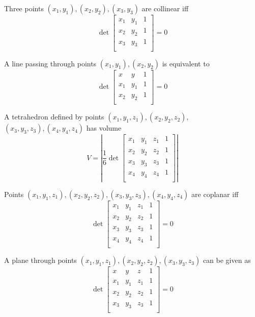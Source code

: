 \begin{theorem}
    Three points \((x_1,y_1),(x_2,y_2),(x_3,y_3)\) are collinear iff 
    \[
        \det \begin{bmatrix}
            x_1 &y_1  &1   \\
             x_2&y_2  &1   \\
             x_3&y_3  &1   \\
        \end{bmatrix}=0
    \]
\end{theorem}
\begin{theorem}
    A line passing through points \((x_1,y_1),(x_2,y_2)\) is equivalent to
    \[
        \det \begin{bmatrix}
            x&y  &1   \\
            x_1 &y_1  &1   \\
             x_2&y_2  &1   \\
        \end{bmatrix}=0
    \]
\end{theorem}
\begin{theorem}
    A tetrahedron defined by points \((x_1,y_1,z_1),(x_2,y_2,z_2),\) \((x_3,y_3,z_3),(x_4,y_4,z_4)\) has volume 
    \[
        V=\left\vert \frac{1}{6}\det \begin{bmatrix}
            x_1 &y_1  &z_1  &   1\\
             x_2&y_2  &z_2  &1   \\
             x_3&y_3  &z_3  &1   \\
             x_4&y_4  &z_4  &1   \\
        \end{bmatrix} \right\vert 
    \]
\end{theorem}
\begin{theorem}
    Points \((x_1,y_1,z_1),(x_2,y_2,z_2),\)\((x_3,y_3,z_3),(x_4,y_4,z_4)\) are coplanar iff 
    \[
        \det \begin{bmatrix}
            x_1 &y_1  &z_1  &   1\\
             x_2&y_2  &z_2  &1   \\
             x_3&y_3  &z_3  &1   \\
             x_4&y_4  &z_4  &1   \\
        \end{bmatrix}=0
    \]
\end{theorem}
\begin{theorem}
    A plane through points \((x_1,y_1,z_1),(x_2,y_2,z_2),(x_3,y_3,z_3)\) can be given as
    \[
        \det \begin{bmatrix}
            x&y  &z  &1   \\
            x_1 &y_1  &z_1  &   1\\
             x_2&y_2  &z_2  &1   \\
             x_3&y_3  &z_3  &1   \\
        \end{bmatrix}=0 
    \]
\end{theorem}

